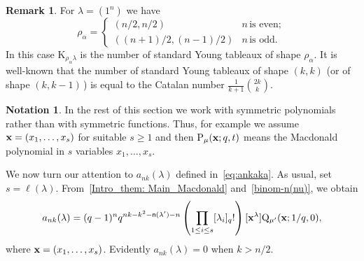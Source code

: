 \documentclass[12pt,a4paper,reqno]{amsart}
\theoremstyle{plain}
\theoremstyle{definition}
\newtheorem{remark}[theorem]{Remark}
\newtheorem{notation}[theorem]{Notation}
\newcommand{\1}{\mathds{1}}
\renewcommand{\P}{\mathrm{P}}
\newcommand{\K}{{\mathrm{K}}}
\newcommand{\Q}{\mathrm{Q}}
\newcommand{\x}{{\bf x}}
\newcommand{\fn}{\mathsf{n}}
\begin{document}
\begin{remark} For $\lambda=(1^n)$ we have 
\begin{equation}
\rho_\alpha=\begin{cases}
(n/2,n/2) & n\, \text{is even};\\
((n+1)/2,(n-1)/2)  & n\, \text{is odd}.
\end{cases}
\end{equation}
In this case $\K_{\rho_\alpha\lambda}$ is the number of standard Young tableaux of shape $\rho_\alpha$. It is well-known that the number of standard Young tableaux of shape $(k,k)$ (or of shape $(k,k-1)\,$) is equal to the Catalan number $\frac{1}{k+1}\binom{2k}{k}$.
\end{remark}


\begin{notation}
In the rest of this section we work with symmetric polynomials rather than with symmetric functions. Thus, for example we assume $\x=(x_1,\ldots,x_s)$ for suitable $s\geq 1$ and then $\P_\mu(\x;q,t)$ means the Macdonald polynomial in $s$ variables $x_1,\ldots,x_s$. 
\end{notation}

We now turn our attention to $a_{nk}(\lambda)$ defined in~\cref{eq:ankaka}. 
As usual, set $s=\ell(\lambda)$. From~\cref{Intro_them: Main_Macdonald} and~\cref{binom-n(nu)}, we obtain
\begin{equation}\label{ankQ_formula}
a_{nk}(\lambda)=(q-1)^n q^{nk-k^2- \fn(\lambda') - n} \left( \prod_{1\leq i\leq s} [\lambda_i]_q! \right) [\x^\lambda] \Q_{\mu'}(\x; 1/q, 0),
\end{equation}
where $\x=(x_1,\dots,x_s)$. 
Evidently $a_{nk}(\lambda)=0$ when $k>n/2$. 
\end{document}
